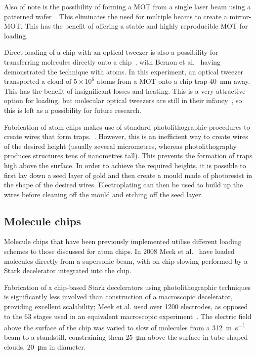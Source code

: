 Also of note is the possibility of forming a MOT from a single laser beam using
a patterned wafer~\cite{Nshii2013}. This eliminates the need for multiple beams
to create a mirror-MOT. This has the benefit of offering a stable and highly
reproducible MOT for loading.

Direct loading of a chip with an optical tweezer is also a possibility for
transferring molecules directly onto a chip~\cite{Liueaar7797}, with Bernon et
al.~\cite{Bernon2013} having demonstrated the technique with atoms. In this
experiment, an optical tweezer transported a cloud of $5\times10^6$ \esRb{}
atoms from a MOT onto a chip trap \SI{40}{\milli\metre} away. This has the
benefit of insignificant losses and heating. This is a very attractive option
for loading, but molecular optical tweezers are still in their
infancy~\cite{Anderegg2019}, so this is left as a possibility for future
research. 

%
Fabrication of atom chips makes use of standard photolithographic procedures to
create wires that form traps.~\cite{2011Ac}. However, this is an inefficient way
to create wires of the desired height (usually several micrometres, whereas
photolithography produces structures tens of nanometres tall). This prevents the
formation of traps high above the surface. In order to achieve the required
heights, it is possible to first lay down a seed layer of gold and then create a
mould made of photoresist in the shape of the desired wires. Electroplating can
then be used to build up the wires before cleaning off the mould and etching off
the seed layer.~\cite{4797887} 

\subsection{Molecule chips}
\label{chiptraps:molculechips}


Molecule chips that have been previously implemented utilise different loading
schemes to those discussed for atom chips. In 2008 Meek et al.~\cite{Meek2008}
have loaded \CO{} molecules directly from a supersonic beam, with on-chip
slowing performed by a Stark decelerator integrated into the chip.

Fabrication of a chip-based Stark decelerators using photolithographic
techniques is significantly less involved than construction of a macroscopic
decelerator, providing excellent scalability; Meek et al. used over 1200
electrodes, as opposed to the 63 stages used in an equivalent macroscopic
experiment~\cite{Bethlem1999}. The electric field above the surface of the chip
was varied to slow of molecules from a \SI{312}{\metre\per\second} beam to a
standstill, constraining them \SI{25}{\micro\metre} above the surface in
tube-shaped clouds, \SI{20}{\micro\metre} in diameter.~\cite{Meek2009}

